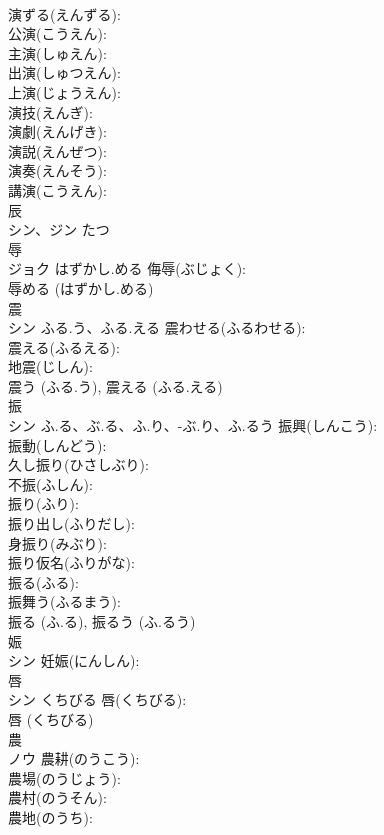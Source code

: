 \documentclass[8pt]{extreport}
\begin{document}
\begin{CJK}{UTF8}{min}
\\	演ずる(えんずる): 
\\	公演(こうえん): 
\\	主演(しゅえん): 
\\	出演(しゅつえん): 
\\	上演(じょうえん): 
\\	演技(えんぎ): 
\\	演劇(えんげき): 
\\	演説(えんぜつ): 
\\	演奏(えんそう): 
\\	講演(こうえん): 
\\	辰			
\\	シン、ジン	たつ		
\\	辱			
\\	ジョク	はずかし.める	侮辱(ぶじょく): 
\\	辱める (はずかし.める)
\\	震			
\\	シン	ふる.う、ふる.える	震わせる(ふるわせる): 
\\	震える(ふるえる): 
\\	地震(じしん): 
\\	震う (ふる.う), 震える (ふる.える)
\\	振			
\\	シン	ふ.る、ぶ.る、ふ.り、-ぶ.り、ふ.るう	振興(しんこう): 
\\	振動(しんどう): 
\\	久し振り(ひさしぶり): 
\\	不振(ふしん): 
\\	振り(ふり): 
\\	振り出し(ふりだし): 
\\	身振り(みぶり): 
\\	振り仮名(ふりがな): 
\\	振る(ふる): 
\\	振舞う(ふるまう): 
\\	振る (ふ.る), 振るう (ふ.るう)
\\	娠			
\\	シン		妊娠(にんしん): 
\\	唇			
\\	シン	くちびる	唇(くちびる): 
\\	唇 (くちびる)
\\	農			
\\	ノウ		農耕(のうこう): 
\\	農場(のうじょう): 
\\	農村(のうそん): 
\\	農地(のうち): 

\end{CJK}
\end{document}
